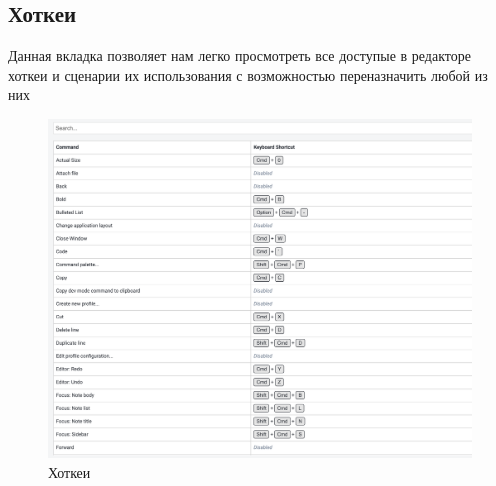 \documentclass[12pt, a4paper]{article}
\begin{document}
    \subsection{Хоткеи}
    Данная вкладка позволяет нам легко просмотреть все доступые в редакторе хоткеи и сценарии их использования с возможностью переназначить любой из них 
    \begin{figure}[H]
        \centering
        \includegraphics[width=0.75\linewidth]{src/18.png}
        \caption{Хоткеи}
    \end{figure}
    
\end{document}
